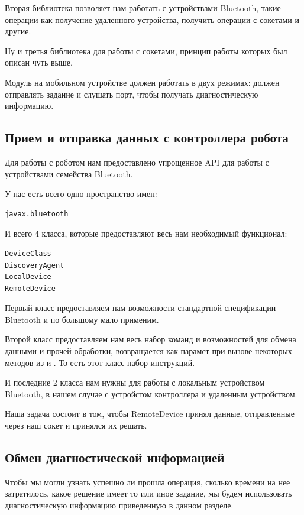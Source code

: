 Вторая библиотека позволяет нам работать с устройствами Bluetooth, такие операции как получение удаленного устройства, получить операции с сокетами и другие.

Ну и третья библиотека для работы с сокетами, принцип работы которых был описан чуть выше.

Модуль на мобильном устройстве должен работать в двух режимах: должен отправлять задание и слушать порт, чтобы получать диагностическую информацию.

\subsection{Прием и отправка данных с контроллера робота}

Для работы с роботом нам предоставлено упрощенное API для работы с устройствами семейства Bluetooth.

У нас есть всего одно пространство имен:
\begin{lstlisting}[caption={Пространство для работы с Bluetooth на контроллерах NXT}, label=lst:design3]
javax.bluetooth
\end{lstlisting}

И всего 4 класса, которые предоставляют весь нам необходимый функционал:
\begin{lstlisting}[caption={Классы для работы с Bluetooth на контроллерах NXT}, label=lst:design4]
DeviceClass 
DiscoveryAgent 
LocalDevice 
RemoteDevice
\end{lstlisting}

Первый класс предоставляем нам возможности стандартной спецификации Bluetooth и по большому мало применим.

Второй класс предоставляем нам весь набор команд и возможностей для обмена данными и прочей обработки, возвращается как парамет при вызове некоторых методов из  и . То есть этот класс набор инструкций. 

И последние 2 класса нам нужны для работы с локальным устройством Bluetooth, в нашем случае с устройстом контроллера и удаленным устройством.

Наша задача состоит в том, чтобы RemoteDevice принял данные, отправленные через наш сокет и принялся их решать.

\subsection{Обмен диагностической информацией}

Чтобы мы могли узнать успешно ли прошла операция, сколько времени на нее затратилось, какое решение имеет то или иное задание, мы будем использовать диагностическую информацию приведенную в данном разделе.


